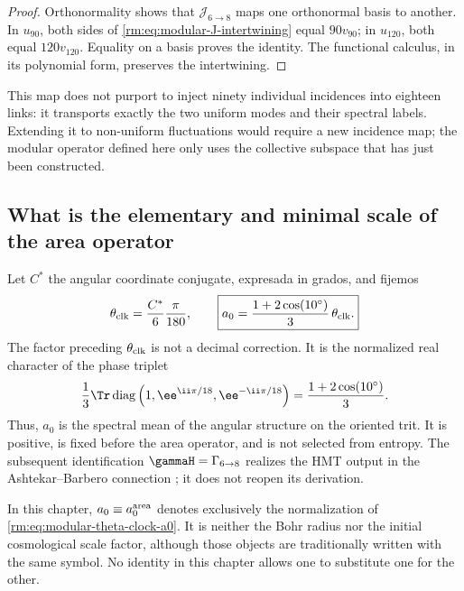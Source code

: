 \begin{proof}
Orthonormality shows that \(\mathcal J_{6\to8}\) maps one
orthonormal basis to another. In \(u_{90}\), both sides of
\cref{rm:eq:modular-J-intertwining} equal \(90v_{90}\); in \(u_{120}\),
both equal \(120v_{120}\). Equality on a basis proves the identity.
The functional calculus, in its polynomial form, preserves the intertwining.
\end{proof}

This map does not purport to inject ninety individual incidences into
eighteen links: it transports exactly the two uniform modes and their
spectral labels. Extending it to non-uniform fluctuations would require
a new incidence map; the modular operator defined here only uses
the collective subspace that has just been constructed.

\subsection{What is the elementary and minimal scale of the area operator}

Let \(C^*\) the angular coordinate conjugate, expresada in grados, and fijemos
\begin{equation}
\label{rm:eq:modular-theta-clock-a0}
\theta_{\rm clk}=\frac{C^*}{6}\frac{\pi}{180},
\qquad
\boxed{
a_0=\frac{1+2\cos(10^\circ)}{3}\,\theta_{\rm clk}.}
\end{equation}
The factor preceding \(\theta_{\rm clk}\) is not a decimal
correction. It is the normalized real character of the phase triplet
\begin{equation}
\label{rm:eq:modular-c10-character}
\frac13\Tr\operatorname{diag}
\left(1,\ee^{\ii\pi/18},\ee^{-\ii\pi/18}\right)
=\frac{1+2\cos(10^\circ)}3.
\end{equation}
Thus, \(a_0\) is the spectral mean of the angular structure on the oriented
trit. It is positive, is fixed before the area operator, and is not
selected from entropy. The subsequent identification
\(\gammaH=\Gamma_{6\to8}\) realizes the HMT output in the Ashtekar--Barbero connection
\cite{Barbero1995,Immirzi1997}; it does not reopen its derivation.

\begin{remark}
In this chapter, \(a_0\equiv a_0^{\rm area}\) denotes exclusively the
normalization of \cref{rm:eq:modular-theta-clock-a0}. It is neither the Bohr radius
nor the initial cosmological scale factor, although those objects are traditionally written
with the same symbol. No identity in this chapter
allows one to substitute one for the other.
\end{remark}
